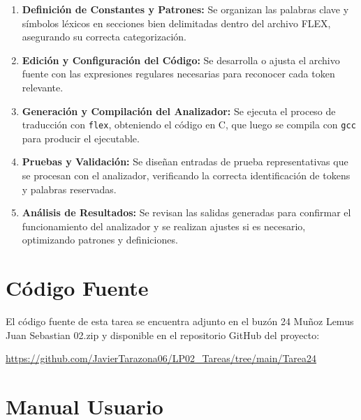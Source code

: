 \documentclass{article}
\begin{document}
\begin{enumerate}
    \item \textbf{Definición de Constantes y Patrones:} Se organizan las palabras clave y símbolos léxicos en secciones bien delimitadas dentro del archivo FLEX, asegurando su correcta categorización.
    \item \textbf{Edición y Configuración del Código:} Se desarrolla o ajusta el archivo fuente con las expresiones regulares necesarias para reconocer cada token relevante.
    \item \textbf{Generación y Compilación del Analizador:} Se ejecuta el proceso de traducción con \texttt{flex}, obteniendo el código en C, que luego se compila con \texttt{gcc} para producir el ejecutable.
    \item \textbf{Pruebas y Validación:} Se diseñan entradas de prueba representativas que se procesan con el analizador, verificando la correcta identificación de tokens y palabras reservadas.
    \item \textbf{Análisis de Resultados:} Se revisan las salidas generadas para confirmar el funcionamiento del analizador y se realizan ajustes si es necesario, optimizando patrones y definiciones.
\end{enumerate}



\section{Código Fuente}\label{sec:cod}

El código fuente de esta tarea se encuentra adjunto en el buzón 
24 Muñoz Lemus Juan Sebastian 02.zip
y disponible en el repositorio GitHub del proyecto:
\begin{center}
\url{https://github.com/JavierTarazona06/LP02_Tareas/tree/main/Tarea24}
\end{center}

\section{Manual Usuario}\label{sec:man_u}
\end{document}
